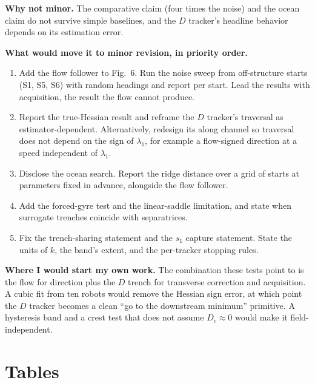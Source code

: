 \documentclass[10.5pt]{article}
\begin{document}
\textbf{Why not minor.} The comparative claim (four times the noise) and the ocean claim do not survive simple baselines, and the $D$ tracker's headline behavior depends on its estimation error.

\textbf{What would move it to minor revision, in priority order.}
\begin{enumerate}[leftmargin=1.4em]
\item Add the flow follower to Fig.~6. Run the noise sweep from off-structure starts (S1, S5, S6) with random headings and report per start. Lead the results with acquisition, the result the flow cannot produce.
\item Report the true-Hessian result and reframe the $D$ tracker's traversal as estimator-dependent. Alternatively, redesign its along channel so traversal does not depend on the sign of $\lambda_1$, for example a flow-signed direction at a speed independent of $\lambda_1$.
\item Disclose the ocean search. Report the ridge distance over a grid of starts at parameters fixed in advance, alongside the flow follower.
\item Add the forced-gyre test and the linear-saddle limitation, and state when surrogate trenches coincide with separatrices.
\item Fix the trench-sharing statement and the $s_1$ capture statement. State the units of $k$, the band's extent, and the per-tracker stopping rules.
\end{enumerate}

\textbf{Where I would start my own work.} The combination these tests point to is the flow for direction plus the $D$ trench for transverse correction and acquisition. A cubic fit from ten robots would remove the Hessian sign error, at which point the $D$ tracker becomes a clean ``go to the downstream minimum'' primitive. A hysteresis band and a crest test that does not assume $D_c\approx0$ would make it field-independent.

\clearpage
\section*{Tables}
\end{document}
